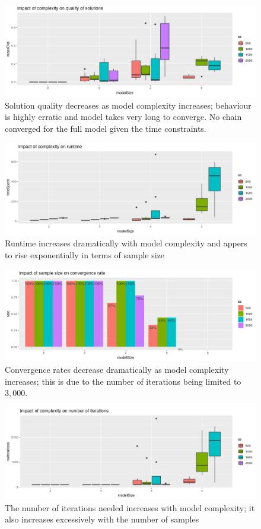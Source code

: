 \begin{figure}
	\includegraphics[width=\linewidth]{img/sim_ben_mh_quality.png}
	\caption{Solution quality decreases as model complexity increases; behaviour is highly erratic and model takes very long to converge. No chain converged for the full model given the time constraints.}
	\label{fig:mh_quality}
\end{figure}



\begin{figure}
	\includegraphics[width=\linewidth]{img/sim_ben_mh_runtime.png}
	\caption{Runtime increases dramatically with model complexity and appers to rise exponentially in terms of sample size}
	\label{fig:mh_runtime}
\end{figure}


\begin{figure}
	\includegraphics[width=\linewidth]{img/sim_ben_mh_convergence.png}
	\caption{Convergence rates decrease dramatically as model complexity increases; this is due to the number of iterations being limited to $3,000$.}
	\label{fig:mh_convergence}
\end{figure}


\begin{figure}
	\includegraphics[width=\linewidth]{img/sim_ben_mh_iterations.png}
	\caption{The number of iterations needed increases with model complexity; it also increases excessively with the number of samples}
	\label{fig:mh_iterations}
\end{figure}